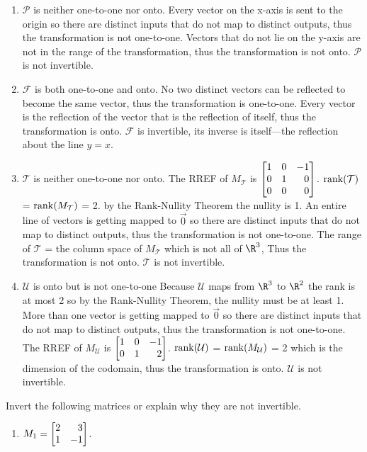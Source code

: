 \begin{exercises}
\begin{problist}
\begin{solution}
\begin{enumerate}
				\item
				$\mathcal P$ is neither one-to-one nor onto.
				Every vector on the x-axis is sent to the origin so there are distinct
				inputs that do not map to distinct outputs,
				thus the transformation is not one-to-one.
				Vectors that do not lie on the y-axis are not in the range of the
				transformation,
				thus the transformation is not onto.
				$\mathcal P$ is not invertible.

				\item
				$\mathcal F$ is both one-to-one and onto.
				No two distinct vectors can be reflected to become the same vector,
				thus the transformation is one-to-one.
				Every vector is the reflection of the vector that is the reflection of
				itself,
				thus the transformation is onto.
				$\mathcal F$ is invertible, its inverse is itself---the reflection about
				the line $y=x$.

				\item
				$\mathcal T$ is neither one-to-one nor onto.
				The RREF of $M_{\mathcal T}$ is $\mat{1&0&-1\\0&1&0\\0&0&0}$.
				$\operatorname{rank}(\mathcal T)$ = $\operatorname{rank}(M_{\mathcal T})$ = 2.
				by the Rank-Nullity Theorem the nullity is 1.
				An entire line of vectors is getting mapped to
				$\vec{0}$ so there are distinct inputs that do not map to distinct
				outputs,
				thus the transformation is not one-to-one.
				The range of $\mathcal T$ = the column space of $M_{\mathcal T}$
				which is not all of $\R^{3}$,
				Thus the transformation is not onto.
				$\mathcal T$ is not invertible.

				\item
				$\mathcal U$ is onto but is not one-to-one
				Because $\mathcal U$ maps from $\R^{3}$ to $\R^{2}$ the rank is at most
				2 so by the Rank-Nullity Theorem, the nullity must be at least 1. More
				than one vector is getting mapped to $\vec{0}$ so there are distinct
				inputs that do not map to distinct outputs,
				thus the transformation is not one-to-one.
				The RREF of $M_{\mathcal U}$ is $\mat{1&0&-1\\0&1&2}$.
				$\operatorname{rank}(\mathcal U)$ = $\operatorname{rank}(M_{\mathcal U})$ = 2 which is
				the dimension of the codomain,
				thus the transformation is onto.
				$\mathcal U$ is not invertible.

			\end{enumerate}
		\end{solution}


		\prob Invert the following matrices or explain why they are not invertible.
		\begin{enumerate}
			\item $M_{1} = \mat{2&3\\1&-1}$.


\end{enumerate}
\end{problist}
\end{exercises}
